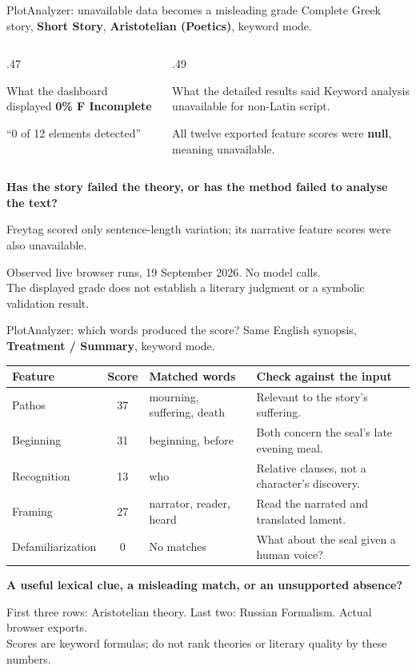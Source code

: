 \documentclass[aspectratio=169,10pt]{beamer}
\newcommand{\key}[1]{\textcolor{aegean}{\textbf{#1}}}
\newcommand{\hl}[1]{\textcolor{terracotta}{\textbf{#1}}}
\newcommand{\source}[1]{\vfill{\scriptsize\color{slate}#1\par}}
\newcommand{\question}[1]{\medskip\par\key{#1}\par}
\begin{document}
\begin{frame}{PlotAnalyzer: unavailable data becomes a misleading grade}
  \small Complete Greek story, \textbf{Short Story}, \textbf{Aristotelian (Poetics)}, keyword mode.
  \begin{columns}[T]
    \begin{column}{.47\textwidth}
      \begin{block}{What the dashboard displayed}
        \Large \hl{0\% \quad F \quad Incomplete}
      \end{block}
      \small “0 of 12 elements detected”
    \end{column}
    \begin{column}{.49\textwidth}
      \begin{block}{What the detailed results said}
        Keyword analysis unavailable for non-Latin script.
      \end{block}
      \small All twelve exported feature scores were \key{null}, meaning unavailable.
    \end{column}
  \end{columns}
  \question{Has the story failed the theory, or has the method failed to analyse the text?}
  \small Freytag scored only sentence-length variation; its narrative feature scores were also unavailable.
  \source{Observed live browser runs, 19 September 2026. No model calls.\\
  The displayed grade does not establish a literary judgment or a symbolic validation result.}
\end{frame}

\begin{frame}{PlotAnalyzer: which words produced the score?}
  \small Same English synopsis, \textbf{Treatment / Summary}, keyword mode.\par\medskip
  \footnotesize
  \begin{tabularx}{\textwidth}{@{}lclX@{}}
    \toprule
    \textbf{Feature} & \textbf{Score} & \textbf{Matched words} & \textbf{Check against the input}\\
    \midrule
    Pathos & 37 & mourning, suffering, death & Relevant to the story's suffering.\\[5pt]
    Beginning & 31 & beginning, before & Both concern the seal's late evening meal.\\[5pt]
    Recognition & 13 & who & Relative clauses, not a character's discovery.\\[5pt]
    Framing & 27 & narrator, reader, heard & Read the narrated and translated lament.\\[5pt]
    Defamiliarization & 0 & No matches & What about the seal given a human voice?\\
    \bottomrule
  \end{tabularx}
  \question{A useful lexical clue, a misleading match, or an unsupported absence?}
  \source{First three rows: Aristotelian theory. Last two: Russian Formalism. Actual browser exports.\\
  Scores are keyword formulas; do not rank theories or literary quality by these numbers.}
\end{frame}
\end{document}
